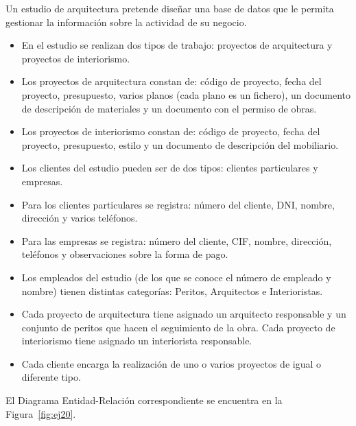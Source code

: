 \begin{ejercicio} \label{ej:20}
    Un estudio de arquitectura pretende diseñar una base de datos que le permita gestionar la información sobre
    la actividad de su negocio.
    \begin{itemize}
        \item En el estudio se realizan dos tipos de trabajo: proyectos de arquitectura y proyectos de interiorismo.
        \item Los proyectos de arquitectura constan de: código de proyecto, fecha del proyecto, presupuesto, varios
        planos (cada plano es un fichero), un documento de descripción de materiales y un documento con el
        permiso de obras.
        \item Los proyectos de interiorismo constan de: código de proyecto, fecha del proyecto, presupuesto, estilo
        y un documento de descripción del mobiliario.
        \item Los clientes del estudio pueden ser de dos tipos: clientes particulares y empresas.
        \item Para los clientes particulares se registra: número del cliente, DNI, nombre, dirección y varios teléfonos.
        \item Para las empresas se registra: número del cliente, CIF, nombre, dirección, teléfonos y observaciones
        sobre la forma de pago.
        \item Los empleados del estudio (de los que se conoce el número de empleado y nombre) tienen distintas
        categorías: Peritos, Arquitectos e Interioristas.
        \item Cada proyecto de arquitectura tiene asignado un arquitecto responsable y un conjunto de peritos que
        hacen el seguimiento de la obra. Cada proyecto de interiorismo tiene asignado un interiorista
        responsable.
        \item Cada cliente encarga la realización de uno o varios proyectos de igual o diferente tipo.
    \end{itemize}

    El Diagrama Entidad-Relación correspondiente se encuentra en la Figura~\ref{fig:ej20}.
    \begin{figure}
        \centering
\end{figure}
\end{ejercicio}
